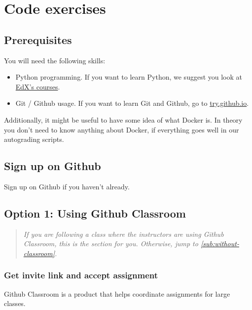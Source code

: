 
\section{\usebox{\chaptergear}
  Code exercises}

\subsection{Prerequisites}

You will need the following skills:

\begin{itemize}
    \item Python programming.
          If you want to learn Python, we suggest you look at
          \href{https://www.edx.org/learn/python}{EdX's courses}.
    \item Git / Github usage.
          If you want to learn Git and Github, go to \href{https://try.github.io/}{try.github.io}.
\end{itemize}

Additionally, it might be useful to have some idea of what Docker is.
In theory you don't need to know anything about Docker, if everything goes well in our autograding scripts.

\subsection{Sign up on Github}

Sign up on Github if you haven't already.

\subsection{Option 1: Using Github Classroom}\label{subsec:with-classroom}

\begin{quote}
    \emph{
        If you are following a class where the instructors are using Github Classroom,
        this is the section for you.
        Otherwise, jump to \cref{sub:without-classroom}.
    }
\end{quote}

\subsubsection{Get invite link and accept assignment}
Github Classroom is a product that helps coordinate assignments for large classes.

